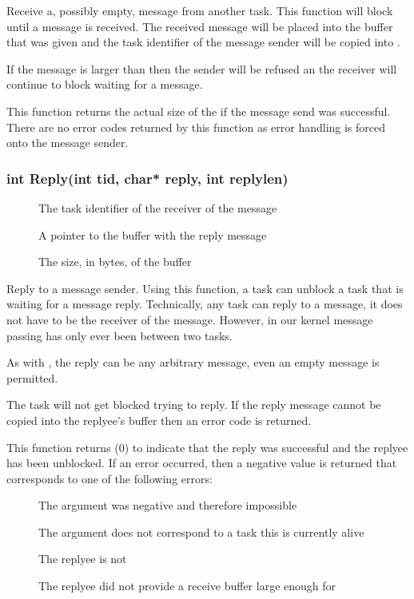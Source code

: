 \documentclass[pdftex,10pt,a4paper]{article}
\begin{document}
Receive a, possibly empty, message from another task. This function
will block until a message is received. The received message will be
placed into the  buffer that was given and the task
identifier of the message sender will be copied into .

If the message is larger than  then the sender will be
refused an the receiver will continue to block waiting for a message.

This function returns the actual size of the  if the
message send was successful. There are no error codes returned by this
function as error handling is forced onto the message sender.


\subsubsection*{int Reply(int tid, char* reply, int replylen)}

\begin{description}
\item[] The task identifier of the receiver of the message
\item[] A pointer to the buffer with the reply message
\item[] The size, in bytes, of the  buffer
\end{description}

Reply to a message sender. Using this function, a task can unblock a
task that is  waiting for a message
reply. Technically, any task can reply to a message, it does not have
to be the receiver of the message. However, in our kernel message
passing has only ever been between two tasks.

As with , the reply can be any arbitrary message, even an
empty message is permitted.

The task will not get blocked trying to reply. If the reply message
cannot be copied into the replyee's buffer then an error code is
returned.

This function returns  ($0$) to indicate that the reply was
successful and the replyee has been unblocked. If an error occurred,
then a negative value is returned that corresponds to one of the
following errors:

\begin{description}
\item[] The  argument was negative
  and therefore impossible
\item[] The  argument does not
  correspond to a task this is currently alive
\item[] The replyee is not 
\item[] The replyee did not provide a
  receive buffer large enough for 
\end{description}
\end{document}

